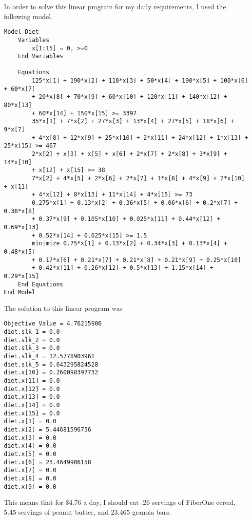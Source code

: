 \documentclass[11pt, oneside]{article}
\begin{document}
In order to solve this linear program for my daily requirements, I used the
following model.
\begin{verbatim}
Model Diet
    Variables
        x[1:15] = 0, >=0
    End Variables

    Equations
        125*x[1] + 190*x[2] + 110*x[3] + 50*x[4] + 190*x[5] + 100*x[6] + 60*x[7]
        + 20*x[8] + 70*x[9] + 60*x[10] + 120*x[11] + 140*x[12] + 80*x[13]
        + 60*x[14] + 150*x[15] >= 3397
        35*x[1] + 7*x[2] + 27*x[3] + 13*x[4] + 27*x[5] + 18*x[6] + 9*x[7]
        + 4*x[8] + 12*x[9] + 25*x[10] + 2*x[11] + 24*x[12] + 1*x[13] + 25*x[15] >= 467
        2*x[2] + x[3] + x[5] + x[6] + 2*x[7] + 2*x[8] + 3*x[9] + 14*x[10]
        + x[12] + x[15] >= 38
        7*x[2] + 4*x[5] + 2*x[6] + 2*x[7] + 1*x[8] + 4*x[9] + 2*x[10] + x[11]
        + 4*x[12] + 8*x[13] + 11*x[14] + 4*x[15] >= 73
        0.275*x[1] + 0.13*x[2] + 0.36*x[5] + 0.06*x[6] + 0.2*x[7] + 0.38*x[8]
        + 0.37*x[9] + 0.105*x[10] + 0.025*x[11] + 0.44*x[12] + 0.69*x[13]
        + 0.52*x[14] + 0.025*x[15] >= 1.5
        minimize 0.75*x[1] + 0.13*x[2] + 0.34*x[3] + 0.13*x[4] + 0.48*x[5]
        + 0.17*x[6] + 0.21*x[7] + 0.21*x[8] + 0.21*x[9] + 0.25*x[10]
        + 0.42*x[11] + 0.26*x[12] + 0.5*x[13] + 1.15*x[14] + 0.29*x[15]
    End Equations
End Model
\end{verbatim}

The solution to this linear program was
\begin{verbatim}
Objective Value = 4.76215906
diet.slk_1 = 0.0
diet.slk_2 = 0.0
diet.slk_3 = 0.0
diet.slk_4 = 12.5778903961
diet.slk_5 = 0.643295824528
diet.x[10] = 0.260098397732
diet.x[11] = 0.0
diet.x[12] = 0.0
diet.x[13] = 0.0
diet.x[14] = 0.0
diet.x[15] = 0.0
diet.x[1] = 0.0
diet.x[2] = 5.44681596756
diet.x[3] = 0.0
diet.x[4] = 0.0
diet.x[5] = 0.0
diet.x[6] = 23.4649906158
diet.x[7] = 0.0
diet.x[8] = 0.0
diet.x[9] = 0.0
\end{verbatim}

This means that for \$4.76 a day, I should eat .26 servings of FiberOne cereal,
5.45 servings of peanut butter, and 23.465 granola bars.
\end{document}
